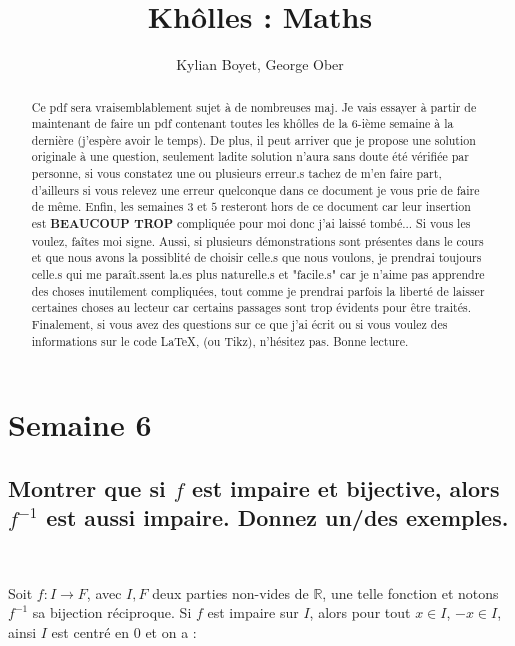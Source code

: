 \documentclass{article}
\title{Khôlles : Maths}
\author{Kylian Boyet, George Ober}
\begin{document}
\maketitle

\begin{abstract}
Ce pdf sera vraisemblablement sujet à de nombreuses maj. Je vais essayer à partir de maintenant de faire un pdf contenant toutes les khôlles de la 6-ième semaine à la dernière (j'espère avoir le temps). De plus, il peut arriver que je propose une solution originale à une question, seulement ladite solution n'aura sans doute été vérifiée par personne, si vous constatez une ou plusieurs erreur.s tachez de m'en faire part, d'ailleurs si vous relevez une erreur quelconque dans ce document je vous prie de faire de même. Enfin, les semaines $3$ et $5$ resteront hors de ce document car leur insertion est \textbf{BEAUCOUP TROP} compliquée pour moi donc j'ai laissé tombé... Si vous les voulez, faîtes moi signe. Aussi, si plusieurs démonstrations sont présentes dans le cours et que nous avons la possiblité de choisir celle.s que nous voulons, je prendrai toujours celle.s qui me paraît.ssent la.es plus naturelle.s et "facile.s" car je n'aime pas apprendre des choses inutilement compliquées, tout comme je prendrai parfois la liberté de laisser certaines choses au lecteur car certains passages sont trop évidents pour être traités. Finalement, si vous avez des questions sur ce que j'ai écrit ou si vous voulez des informations sur le code \LaTeX   , (ou Tikz), n'hésitez pas. Bonne lecture.
\end{abstract}


\tableofcontents

\newpage

\section{Semaine 6} 
\label{sec:S6}

\subsection{Montrer que si $f$ est impaire et bijective, alors $f^{-1}$ est aussi impaire. Donnez un/des exemples.} 

\

Soit $f: I \to F$, avec $I,F$ deux parties non-vides de $\mathbb{R}$, une telle fonction et notons $f^{-1}$ sa bijection réciproque. Si $f$ est impaire sur $I$, alors pour tout $x\in I$, $-x\in I$, ainsi $I$ est centré en $0$ et on a : 
\end{document}
